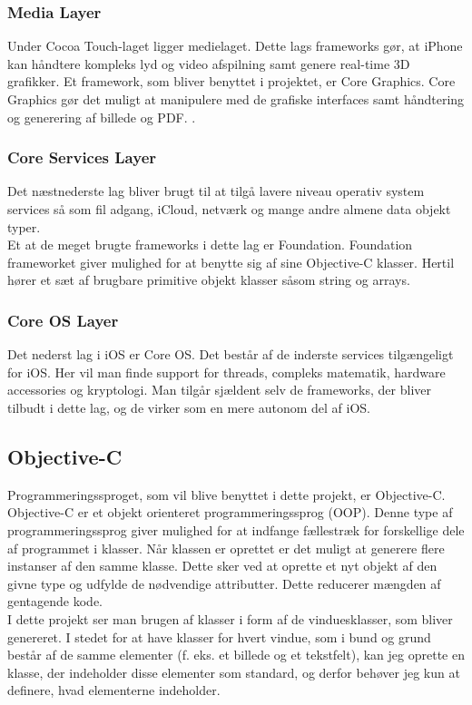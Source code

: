 \documentclass[a4paper,10pt,titlepage]{article}
\begin{document}
\subsubsection{Media Layer}
Under Cocoa Touch-laget ligger medielaget. Dette lags frameworks gør, at iPhone kan håndtere kompleks lyd og video afspilning samt genere real-time 3D grafikker\parencite[side 105]{Teach}. Et framework, som bliver benyttet i projektet, er Core Graphics. Core Graphics gør det muligt at manipulere med de grafiske interfaces samt håndtering og generering af billede og PDF. \parencite{CoreService}.
\subsubsection{Core Services Layer}
Det næstnederste lag bliver brugt til at tilgå lavere niveau operativ system services så som fil adgang, iCloud, netværk og mange andre almene data objekt typer.\parencite[side 106]{Teach}\\
Et at de meget brugte frameworks i dette lag er Foundation. Foundation frameworket giver mulighed for at benytte sig af sine Objective-C klasser. Hertil hører et sæt af brugbare primitive objekt klasser såsom string og arrays. \parencite{CoreFound}
\subsubsection{Core OS Layer}
Det nederst lag i iOS er Core OS. Det består af de inderste services tilgængeligt for iOS. Her vil man finde support for threads, compleks matematik, hardware accessories og kryptologi. Man tilgår sjældent selv de frameworks, der bliver tilbudt i dette lag, og de virker som en mere autonom del af iOS.
\subsection{Objective-C}
Programmeringssproget, som vil blive benyttet i dette projekt, er Objective-C. Objective-C er et objekt orienteret programmeringssprog (OOP). Denne type af programmeringssprog giver mulighed for at indfange fællestræk for forskellige dele af programmet i klasser. Når klassen er oprettet er det muligt at generere flere instanser af den samme klasse. Dette sker ved at oprette et nyt objekt af den givne type og udfylde de nødvendige attributter. Dette reducerer mængden af gentagende kode. \parencite[side 68-69]{Teach}\\ I dette projekt ser man brugen af klasser i form af de vinduesklasser, som bliver genereret. I stedet for at have klasser for hvert vindue, som i bund og grund består af de samme elementer (f. eks. et billede og et tekstfelt), kan jeg oprette en klasse, der indeholder disse elementer som standard, og derfor behøver jeg kun at definere, hvad elementerne indeholder.\\
\end{document}
